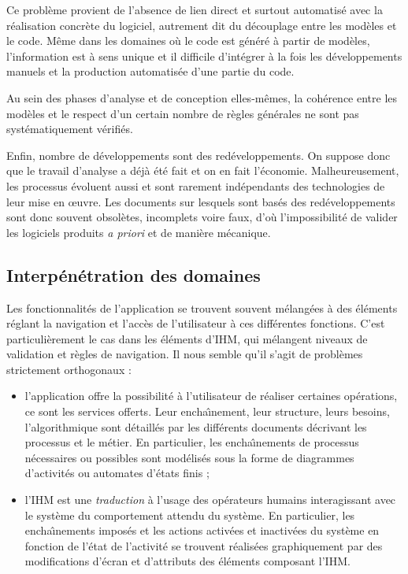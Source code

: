Ce probl\`eme provient de
l'absence de lien direct et surtout automatis\'e avec la r\'ealisation
concr\`ete du logiciel, autrement dit du d\'ecouplage entre les
mod\`eles et le code. M\^eme dans les domaines o\`u le code est
g\'en\'er\'e \`a partir de mod\`eles, l'information est \`a sens
unique et il difficile d'int\'egrer \`a la fois les
d\'eveloppements manuels et la production automatis\'ee d'une partie
du code. 

Au sein des phases d'analyse et de conception elles-m\^emes, la
coh\'erence entre les mod\`eles et le respect d'un certain nombre de
r\`egles g\'en\'erales ne sont pas syst\'ematiquement
v\'erifi\'es. 

Enfin, nombre de d\'eveloppements sont des red\'eveloppements. On
suppose donc que le travail d'analyse a d\'ej\`a \'et\'e fait et
on en fait l'\'economie. Malheureusement, les processus \'evoluent
aussi et sont rarement ind\'ependants des technologies de leur mise
en \oe uvre. Les documents sur lesquels sont bas\'es des
red\'eveloppements sont donc souvent obsol\`etes, incomplets voire
faux, d'o\`u l'impossibilit\'e de valider les logiciels produits \emph{a
priori} et de mani\`ere m\'ecanique.

\subsection{Interp\'en\'etration des domaines}

Les fonctionnalit\'es de l'application se trouvent
souvent m\'elang\'ees \`a des \'el\'ements r\'eglant la navigation et
l'acc\`es de l'utilisateur \`a ces diff\'erentes fonctions. C'est
particuli\`erement le cas dans les \'el\'ements
d'\textsf{IHM}, qui m\'elangent niveaux de validation et r\`egles de
navigation. Il nous semble qu'il s'agit de probl\`emes strictement orthogonaux :
\begin{itemize}
\item l'application offre la possibilit\'e \`a l'utilisateur de
r\'ealiser certaines op\'erations, ce sont les services
offerts. Leur encha\^{\i}nement, leur structure, leurs besoins, l'algorithmique
sont d\'etaill\'es par les diff\'erents documents d\'ecrivant
les processus et le m\'etier. En particulier, les encha\^{\i}nements
de processus n\'ecessaires ou possibles sont mod\'elis\'es sous la
forme de diagrammes d'activit\'es ou automates d'\'etats finis ;
\item l'\textsf{IHM} est une \emph{traduction} \`a l'usage des op\'erateurs humains
interagissant avec le syst\`eme du comportement attendu du
syst\`eme. En particulier, les encha\^{\i}nements impos\'es et les
actions activ\'ees et inactiv\'ees du syst\`eme en fonction de
l'\'etat de l'activit\'e se trouvent r\'ealis\'ees graphiquement
par des modifications d'\'ecran et d'attributs des \'el\'ements
composant l'\textsf{IHM}.
\end{itemize}

